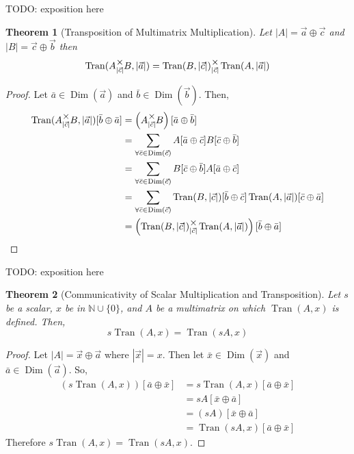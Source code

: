 \documentclass[12pt]{book}
\theoremstyle{definition}
\theoremstyle{plain}
\newtheorem{theorem}{Theorem}[chapter]
\theoremstyle{ppart}
\theoremstyle{case}
\theoremstyle{solution}
\DeclareMathOperator{\Dim}{Dim}
\DeclareMathOperator{\Tran}{Tran}
\newcommand{\mmult}[1]{\text{\raisebox{1ex}{$\underset{#1}{\times}$}}}
\begin{document}
TODO: exposition here

\begin{theorem}[Transposition of Multimatrix Multiplication]
\label{mm_tran_mult}
Let $|A| = \vec{a} \oplus \vec{c}$ and $|B| = \vec{c} \oplus \vec{b}$ then
\[
 \Tran(A \mmult{|\vec{c}|} B, |\vec{a}|)
 =  \Tran(B, |\vec{c}|) \mmult{|\vec{c}|} \Tran(A, |\vec{a}|)
\]
\end{theorem}
\begin{proof}
Let $\bar{a} \in \Dim(\vec{a})$ and $\bar{b} \in \Dim(\vec{b})$.
Then,
\begin{align*}
	\Tran(A \mmult{|\vec{c}|} B, |\vec{a}|)[\bar{b} \oplus \bar{a}]
	&=
	\left(A \mmult{|\vec{c}|} B \right)[\bar{a} \oplus \bar{b}] \\
	&=
	\sum_{\forall \bar{c} \in \Dim(\vec{c})}
	A[\bar{a} \oplus \bar{c}] B[\bar{c} \oplus \bar{b}] \\
	&=
	\sum_{\forall \bar{c} \in \Dim(\vec{c})}
	B[\bar{c} \oplus \bar{b}] A[\bar{a} \oplus \bar{c}] \\
	&=
	\sum_{\forall \bar{c} \in \Dim(\vec{c})}
	\Tran(B, |\vec{c}|)[\bar{b} \oplus \bar{c}]
	\Tran(A, |\vec{a}|)[\bar{c} \oplus \bar{a}] \\
	&=
	\left(\Tran(B, |\vec{c}|) \mmult{|\vec{c}|} \Tran(A, |\vec{a}|) \right)
	[\bar{b} \oplus \bar{a}]
\end{align*}
\end{proof}

TODO: exposition here

\begin{theorem}[Communicativity of Scalar Multiplication and Transposition]
Let $s$ be a scalar, $x$ be in $\mathbb{N} \cup \{0\}$, and $A$ be
a multimatrix on which $\Tran(A, x)$ is defined. Then,
\[ s\Tran(A, x) = \Tran(sA, x) \]
\end{theorem}
\begin{proof}
Let $|A| = \vec{x} \oplus \vec{a}$ where $|\vec{x}| = x$. Then
let $\bar{x} \in \Dim(\vec{x})$ and $\bar{a} \in \Dim(\vec{a})$. So,
\begin{align*}
  (s\Tran(A, x))[\bar{a} \oplus \bar{x}]
  &= s \Tran(A, x)[\bar{a} \oplus \bar{x}] \\
  &= s A[\bar{x} \oplus \bar{a}] \\
  &= (s A)[\bar{x} \oplus \bar{a}] \\
  &= \Tran(sA, x)[\bar{a} \oplus \bar{x}]
\end{align*}
Therefore $s\Tran(A, x) = \Tran(sA, x)$.
\end{proof}
\end{document}
